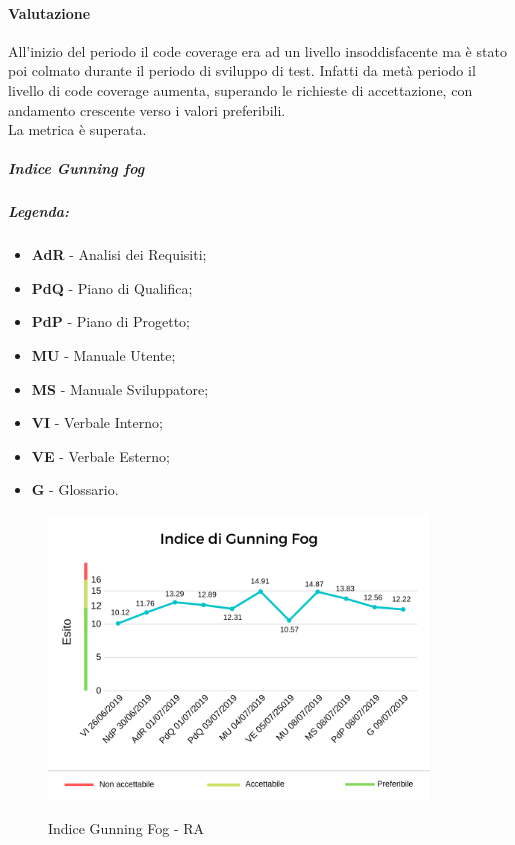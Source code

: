 	\paragraph*{Valutazione} All'inizio del periodo il code coverage era ad un livello insoddisfacente ma è stato poi colmato durante il periodo di sviluppo di test. Infatti da metà periodo il livello di code coverage aumenta, superando le richieste di accettazione, con andamento crescente verso i valori preferibili. \\
	La metrica è superata.
	\pagebreak
	\subparagraph{Indice Gunning fog} 
	\subparagraph*{Legenda:}
\begin{itemize}
	\item \textbf{AdR} - Analisi dei Requisiti;
	\item \textbf{PdQ} - Piano di Qualifica;
	\item \textbf{PdP} - Piano di Progetto;
	\item \textbf{MU} - Manuale Utente;
	\item \textbf{MS} - Manuale Sviluppatore;
	\item \textbf{VI} - Verbale Interno;
	\item \textbf{VE} - Verbale Esterno;
	\item \textbf{G} - Glossario.
\end{itemize}
	\begin{center}
		\begin{figure}[h] 
			\centering 
			\includegraphics[width=0.90\textwidth]{res/images/new/gunningfog.png}\\
			\caption{Indice Gunning Fog - RA}
		\end{figure}
	\end{center}
